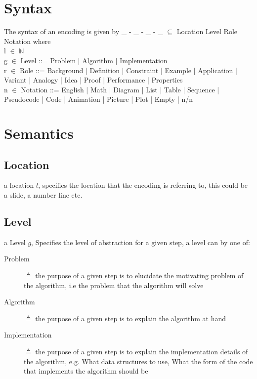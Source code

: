 \documentclass[10pt, letterpaper]{article}
\begin{document}
\section*{Syntax}
\label{sec:org1ee15f7}
The syntax of an encoding is given by \_ - \_ - \_ - \_ \(\subseteq\) Location \texttimes{} Level \texttimes{} Role \texttimes{} Notation where \\

l \(\in\) \(\mathbb{N}\) \\

g \(\in\) Level ::= Problem | Algorithm | Implementation \\

r \(\in\) Role ::= Background | Definition | Constraint | Example | Application | Variant | Analogy | Idea | Proof | Performance | Properties \\

n \(\in\) Notation ::= English | Math | Diagram | List | Table | Sequence | Pseudocode | Code | Animation | Picture | Plot | Empty | n/n \\

\section*{Semantics}
\label{sec:orgc0bd108}
\subsection*{Location}
\label{sec:org41bae11}
a location \(l\), specifies the location that the encoding is referring to,
this could be a slide, a number line etc.
\subsection*{Level}
\label{sec:org6cfb060}
a Level \(g\), Specifies the level of abstraction for a given step, a level can by one of:
\begin{description}
\item[{Problem}] \(\triangleq\) the purpose of a given step is to elucidate the
motivating problem of the algorithm, i.e the problem that the algorithm
will solve
\item[{Algorithm}] \(\triangleq\) the purpose of a given step is to explain the
algorithm at hand
\item[{Implementation}] \(\triangleq\) the purpose of a given step is to explain the
implementation details of the algorithm, e.g. What data structures to
use, What the form of the code that implements the algorithm should be
\end{description}
\end{document}
